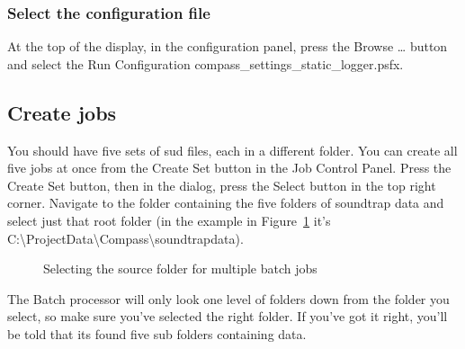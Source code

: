 \documentclass[
]{article}
\begin{document}
\subsubsection{Select the configuration
file}\label{select-the-configuration-file}

At the top of the display, in the configuration panel, press the Browse
\ldots{} button and select the Run Configuration
compass\_settings\_static\_logger.psfx.

\subsection{Create jobs}\label{create-jobs}

You should have five sets of sud files, each in a different folder. You
can create all five jobs at once from the Create Set button in the Job
Control Panel. Press the Create Set button, then in the dialog, press
the Select button in the top right corner. Navigate to the folder
containing the five folders of soundtrap data and select just that root
folder (in the example in Figure~\ref{fig-createset} it's
C:\textbackslash ProjectData\textbackslash Compass\textbackslash soundtrapdata).

\begin{figure}


\caption{\label{fig-createset}Selecting the source folder for multiple
batch jobs}

\end{figure}%

The Batch processor will only look one level of folders down from the
folder you select, so make sure you've selected the right folder. If
you've got it right, you'll be told that its found five sub folders
containing data.
\end{document}
